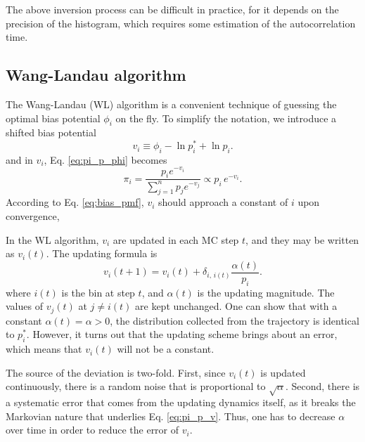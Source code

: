 \documentclass[reprint]{revtex4-1}
\begin{document}
The above inversion process can be difficult
in practice,
for it depends on the precision of the histogram,
which requires some estimation
of the autocorrelation time.



\subsection{Wang-Landau algorithm}



The Wang-Landau (WL) algorithm is a convenient technique
of guessing the optimal bias potential $\phi_i$
on the fly.
%
To simplify the notation, we introduce
a shifted bias potential
%
\begin{equation}
  v_i \equiv \phi_i - \ln p^*_i + \ln p_i.
  \label{eq:vi_def}
\end{equation}
%
%
and in $v_i$, Eq. \eqref{eq:pi_p_phi}
becomes
%
\begin{equation}
  \pi_i = \frac{ p_i e^{-v_i} }
  { \sum_{j = 1}^n p_j e^{-v_j} }
  \propto p_i \, e^{-v_i}.
  \label{eq:pi_p_v}
\end{equation}
%
According to Eq. \eqref{eq:bias_pmf},
$v_i$ should approach a constant of $i$
upon convergence,



In the WL algorithm, $v_i$ are updated
in each MC step $t$,
and they may be written as $v_i(t)$.
%
The updating formula is
%
\begin{equation}
  v_i(t+1)
  =
  v_i(t)
  +
  \delta_{i, \, i(t)}
  \frac{ \alpha(t) } { p_i }.
  \label{eq:wl_update}
\end{equation}
%
where $i(t)$ is the bin at step $t$,
and $\alpha(t)$ is the updating magnitude.
%
The values of $v_j(t)$ at $j \ne i(t)$
are kept unchanged.
%
One can show that with a constant $\alpha(t) = \alpha > 0$,
the distribution collected from
the trajectory is identical to $p^*_i$.
%
However, it turns out that
the updating scheme brings about an error,
which means that $v_i(t)$ will not be a constant.



The source of the deviation is two-fold.
%
First, since $v_i(t)$ is updated continuously,
there is a random noise that is proportional
to $\sqrt \alpha$.
%
Second, there is a systematic error
that comes from the updating dynamics itself,
as it breaks the Markovian nature
that underlies Eq. \eqref{eq:pi_p_v}.
%
Thus, one has to decrease $\alpha$ over time
in order to reduce the error of $v_i$.
\end{document}
